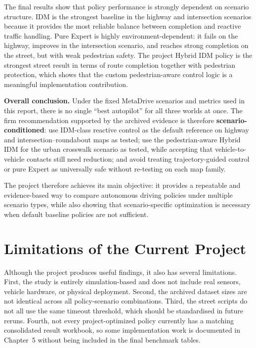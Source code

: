 \documentclass[12pt,a4paper]{report}
\begin{document}
The final results show that policy performance is strongly dependent on scenario structure. IDM is the strongest baseline in the highway and intersection scenarios because it provides the most reliable balance between completion and reactive traffic handling. Pure Expert is highly environment-dependent: it fails on the highway, improves in the intersection scenario, and reaches strong completion on the street, but with weak pedestrian safety. The project Hybrid IDM policy is the strongest street result in terms of route completion together with pedestrian protection, which shows that the custom pedestrian-aware control logic is a meaningful implementation contribution.

\textbf{Overall conclusion.} Under the fixed MetaDrive scenarios and metrics used in this report, there is no single ``best autopilot'' for all three worlds at once. The firm recommendation supported by the archived evidence is therefore \textbf{scenario-conditioned}: use IDM-class reactive control as the default reference on highway and intersection--roundabout maps as tested; use the pedestrian-aware Hybrid IDM for the urban crosswalk scenario as tested, while accepting that vehicle-to-vehicle contacts still need reduction; and avoid treating trajectory-guided control or pure Expert as universally safe without re-testing on each map family.

The project therefore achieves its main objective: it provides a repeatable and evidence-based way to compare autonomous driving policies under multiple scenario types, while also showing that scenario-specific optimization is necessary when default baseline policies are not sufficient.

\section{Limitations of the Current Project}
Although the project produces useful findings, it also has several limitations. First, the study is entirely simulation-based and does not include real sensors, vehicle hardware, or physical deployment. Second, the archived dataset sizes are not identical across all policy-scenario combinations. Third, the street scripts do not all use the same timeout threshold, which should be standardised in future reruns. Fourth, not every project-optimized policy currently has a matching consolidated result workbook, so some implementation work is documented in Chapter~5 without being included in the final benchmark tables.
\end{document}
